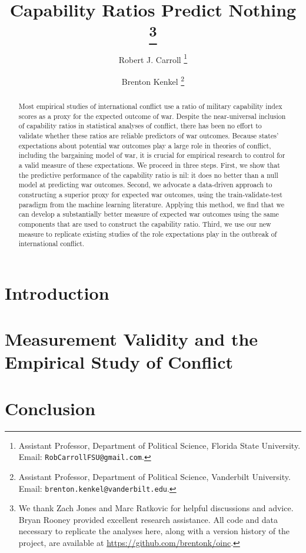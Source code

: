 \documentclass[11pt,oneside]{article}
\title{
  Capability Ratios Predict Nothing%
  \thanks{%
    We thank Zach Jones and Marc Ratkovic for helpful discussions and advice.
    Bryan Rooney provided excellent research assistance.
    All code and data necessary to replicate the analyses here, along with a version history of the project, are available at \url{https://github.com/brentonk/oinc}.
  }%
}
\author{%
  Robert J. Carroll%
  \thanks{%
    Assistant Professor, Department of Political Science, Florida State University.  Email:  \nolinkurl{RobCarrollFSU@gmail.com}.
  }%
  \and%
  Brenton Kenkel%
  \thanks{
    Assistant Professor, Department of Political Science, Vanderbilt University.
    Email: \nolinkurl{brenton.kenkel@vanderbilt.edu}.
  }%
}
\begin{document}
\maketitle

\begin{abstract}
  Most empirical studies of international conflict use a ratio of military capability index scores as a proxy for the expected outcome of war.
  Despite the near-universal inclusion of capability ratios in statistical analyses of conflict, there has been no effort to validate whether these ratios are reliable predictors of war outcomes.
  Because states' expectations about potential war outcomes play a large role in theories of conflict, including the bargaining model of war, it is crucial for empirical research to control for a valid measure of these expectations.
  We proceed in three steps.
  First, we show that the predictive performance of the capability ratio is nil: it does no better than a null model at predicting war outcomes.
  Second, we advocate a data-driven approach to constructing a superior proxy for expected war outcomes, using the train-validate-test paradigm from the machine learning literature.
  Applying this method, we find that we can develop a substantially better measure of expected war outcomes using the same components that are used to construct the capability ratio.
  Third, we use our new measure to replicate existing studies of the role expectations play in the outbreak of international conflict.
\end{abstract}

\clearpage


\section{Introduction}











\section{Measurement Validity and the Empirical Study of Conflict}


\section{Conclusion}


\clearpage
\appendix


\newpage


\end{document}
